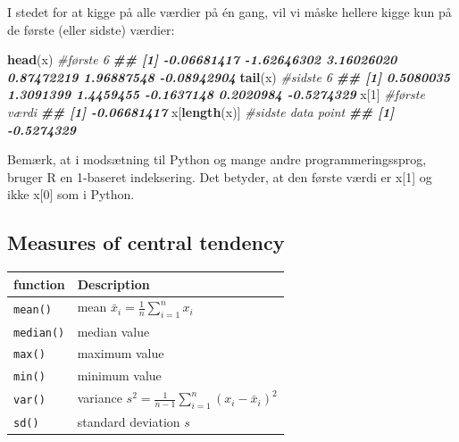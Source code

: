 \documentclass[
]{book}
\newenvironment{Shaded}{\begin{snugshade}}{\end{snugshade}}
\newcommand{\CommentTok}[1]{\textcolor[rgb]{0.56,0.35,0.01}{\textit{#1}}}
\newcommand{\DecValTok}[1]{\textcolor[rgb]{0.00,0.00,0.81}{#1}}
\newcommand{\DocumentationTok}[1]{\textcolor[rgb]{0.56,0.35,0.01}{\textbf{\textit{#1}}}}
\newcommand{\FunctionTok}[1]{\textcolor[rgb]{0.13,0.29,0.53}{\textbf{#1}}}
\newcommand{\NormalTok}[1]{#1}
\begin{document}
I stedet for at kigge på alle værdier på én gang, vil vi måske hellere kigge kun på de første (eller sidste) værdier:

\begin{Shaded}
\begin{Highlighting}[]
\FunctionTok{head}\NormalTok{(x) }\CommentTok{\#første 6}
\DocumentationTok{\#\# [1] {-}0.06681417 {-}1.62646302  3.16026020  0.87472219  1.96887548 {-}0.08942904}
\FunctionTok{tail}\NormalTok{(x) }\CommentTok{\#sidste 6}
\DocumentationTok{\#\# [1]  0.5080035  1.3091399  1.4459455 {-}0.1637148  0.2020984 {-}0.5274329}
\NormalTok{x[}\DecValTok{1}\NormalTok{] }\CommentTok{\#første værdi}
\DocumentationTok{\#\# [1] {-}0.06681417}
\NormalTok{x[}\FunctionTok{length}\NormalTok{(x)] }\CommentTok{\#sidste data point}
\DocumentationTok{\#\# [1] {-}0.5274329}
\end{Highlighting}
\end{Shaded}

Bemærk, at i modsætning til Python og mange andre programmeringssprog, bruger R en 1-baseret indeksering. Det betyder, at den første værdi er x{[}1{]} og ikke x{[}0{]} som i Python.

\subsection{Measures of central tendency}\label{measures-of-central-tendency}

\begin{longtable}[]{@{}
  >{\raggedright\arraybackslash}p{}
  >{\raggedright\arraybackslash}p{}@{}}
\toprule\noalign{}
\begin{minipage}[b]{\linewidth}\raggedright
function
\end{minipage} & \begin{minipage}[b]{\linewidth}\raggedright
Description
\end{minipage} \\
\midrule\noalign{}
\endhead
\bottomrule\noalign{}
\endlastfoot
\texttt{mean()} & mean \(\bar{x}_{i} = \frac{1}{n}\sum_{i=1}^{n} x_{i}\) \\
\texttt{median()} & median value \\
\texttt{max()} & maximum value \\
\texttt{min()} & minimum value \\
\texttt{var()} & variance \(s^2 = \frac{1}{n-1}\sum_{i=1}^{n} (x_{i} - \bar{x}_{i})^2\) \\
\texttt{sd()} & standard deviation \(s\) \\
\end{longtable}
\end{document}
